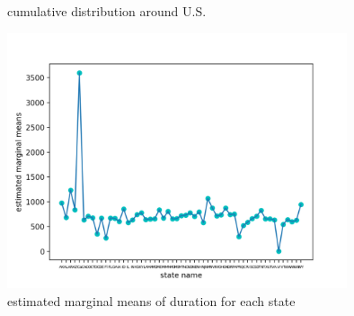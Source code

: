 \begin{figure}[H]
\centering 
{}
\caption{cumulative distribution around U.S.}
\end{figure}


\begin{figure}[H]
    \centering
    \includegraphics[width=10cm]{figure/marginal.png}
    \caption{estimated marginal means of duration for each state}
    \label{mean}
\end{figure}


